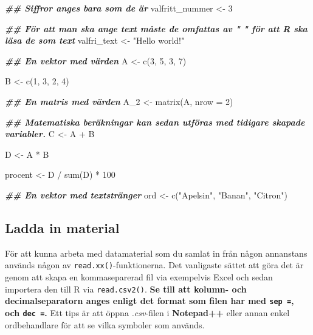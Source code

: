 \documentclass[
]{book}
\newenvironment{Shaded}{\begin{snugshade}}{\end{snugshade}}
\newcommand{\AttributeTok}[1]{\textcolor[rgb]{0.77,0.63,0.00}{#1}}
\newcommand{\DecValTok}[1]{\textcolor[rgb]{0.00,0.00,0.81}{#1}}
\newcommand{\DocumentationTok}[1]{\textcolor[rgb]{0.56,0.35,0.01}{\textbf{\textit{#1}}}}
\newcommand{\FunctionTok}[1]{\textcolor[rgb]{0.00,0.00,0.00}{#1}}
\newcommand{\NormalTok}[1]{#1}
\newcommand{\OtherTok}[1]{\textcolor[rgb]{0.56,0.35,0.01}{#1}}
\newcommand{\SpecialCharTok}[1]{\textcolor[rgb]{0.00,0.00,0.00}{#1}}
\newcommand{\StringTok}[1]{\textcolor[rgb]{0.31,0.60,0.02}{#1}}
\theoremstyle{definition}
\theoremstyle{definition}
\theoremstyle{definition}
\theoremstyle{definition}
\theoremstyle{remark}
\begin{document}
\begin{Shaded}
\begin{Highlighting}[]
\DocumentationTok{\#\# Siffror anges bara som de är}
\NormalTok{valfritt\_nummer }\OtherTok{\textless{}{-}} \DecValTok{3}

\DocumentationTok{\#\# För att man ska ange text måste de omfattas av " " för att R ska läsa de som text}
\NormalTok{valfri\_text }\OtherTok{\textless{}{-}} \StringTok{"Hello world!"}

\DocumentationTok{\#\# En vektor med värden}
\NormalTok{A }\OtherTok{\textless{}{-}} \FunctionTok{c}\NormalTok{(}\DecValTok{3}\NormalTok{, }\DecValTok{5}\NormalTok{, }\DecValTok{3}\NormalTok{, }\DecValTok{7}\NormalTok{)}

\NormalTok{B }\OtherTok{\textless{}{-}} \FunctionTok{c}\NormalTok{(}\DecValTok{1}\NormalTok{, }\DecValTok{3}\NormalTok{, }\DecValTok{2}\NormalTok{, }\DecValTok{4}\NormalTok{)}

\DocumentationTok{\#\# En matris med värden}
\NormalTok{A\_2 }\OtherTok{\textless{}{-}} \FunctionTok{matrix}\NormalTok{(A, }\AttributeTok{nrow =} \DecValTok{2}\NormalTok{)}

\DocumentationTok{\#\# Matematiska beräkningar kan sedan utföras med tidigare skapade variabler.}
\NormalTok{C }\OtherTok{\textless{}{-}}\NormalTok{ A }\SpecialCharTok{+}\NormalTok{ B}

\NormalTok{D }\OtherTok{\textless{}{-}}\NormalTok{ A }\SpecialCharTok{*}\NormalTok{ B}

\NormalTok{procent }\OtherTok{\textless{}{-}}\NormalTok{ D }\SpecialCharTok{/} \FunctionTok{sum}\NormalTok{(D) }\SpecialCharTok{*} \DecValTok{100}

\DocumentationTok{\#\# En vektor med textstränger}
\NormalTok{ord }\OtherTok{\textless{}{-}} \FunctionTok{c}\NormalTok{(}\StringTok{"Apelsin"}\NormalTok{, }\StringTok{"Banan"}\NormalTok{, }\StringTok{"Citron"}\NormalTok{)}
\end{Highlighting}
\end{Shaded}

\hypertarget{ladda-in-material}{%
\subsection{Ladda in material}\label{ladda-in-material}}

För att kunna arbeta med datamaterial som du samlat in från någon annanstans används någon av \texttt{read.xx()}-funktionerna. Det vanligaste sättet att göra det är genom att skapa en kommaseparerad fil via exempelvis Excel och sedan importera den till R via \texttt{read.csv2()}. \textbf{Se till att kolumn- och decimalseparatorn anges enligt det format som filen har med \texttt{sep\ =}, och \texttt{dec\ =}.} Ett tips är att öppna \emph{.csv}-filen i \textbf{Notepad++} eller annan enkel ordbehandlare för att se vilka symboler som används.
\end{document}
